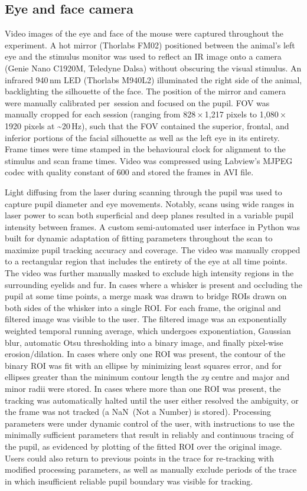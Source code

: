 \documentclass{article}
\begin{document}
\subsection*{Eye and face camera}

Video images of the eye and face of the mouse were captured throughout the experiment. A hot mirror (Thorlabs FM02) positioned between the animal’s left eye and the stimulus monitor was used to reflect an IR image onto a camera (Genie Nano C1920M, Teledyne Dalsa) without obscuring the visual stimulus. An infrared 940\,nm LED (Thorlabs M940L2) illuminated the right side of the animal, backlighting the silhouette of the face. The position of the mirror and camera were manually calibrated per~session and focused on the pupil. FOV was manually cropped for each session (ranging from 828\,×\,1,217 pixels to 1,080\,×\,1920 pixels at \textasciitilde{}20\,Hz), such that the FOV contained the superior, frontal, and inferior portions of the facial silhouette as well as the left eye in its entirety. Frame times were time stamped in the behavioural clock for alignment to the stimulus and scan frame times. Video was compressed using Labview’s MJPEG codec with quality constant of 600 and stored the frames in AVI file.

Light diffusing from the laser during scanning through the pupil was used to capture pupil diameter and eye movements. Notably, scans using wide ranges in laser power to scan both superficial and deep planes resulted in a variable pupil intensity between frames. A custom semi-automated user interface in Python was built for dynamic adaptation of fitting parameters throughout the scan to maximize pupil tracking accuracy and coverage. The video was manually cropped to a rectangular region that includes the entirety of the eye at all time points. The video was further manually masked to exclude high intensity regions in the surrounding eyelids and fur. In cases where a whisker is present and occluding the pupil at some time points, a merge mask was drawn to bridge ROIs drawn on both sides of the whisker into a single ROI. For each frame, the original and filtered image was visible to the user. The filtered image was an exponentially weighted temporal running average, which undergoes exponentiation, Gaussian blur, automatic Otsu thresholding into a binary image, and finally pixel-wise erosion/dilation. In cases where only one ROI was present, the contour of the binary ROI was fit with an ellipse by minimizing least squares error, and for ellipses greater than the minimum contour length the \emph{xy} centre and major and minor radii were stored. In cases where more than one ROI was present, the tracking was automatically halted until the user either resolved the ambiguity, or the frame was not tracked (a NaN~(Not a Number) is stored). Processing parameters were under dynamic control of the user, with instructions to use the minimally sufficient parameters that result in reliably and continuous tracing of the pupil, as evidenced by plotting of the fitted ROI over the original image. Users could also return to previous points in the trace for re-tracking with modified processing parameters, as well as manually exclude periods of the trace in which insufficient reliable pupil boundary was visible for tracking.
\end{document}

